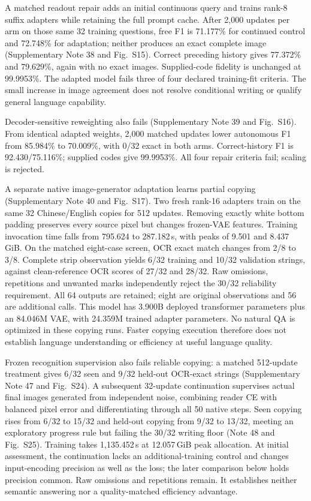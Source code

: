 \documentclass[12pt,a4paper]{article}
\begin{document}
A matched readout repair adds an initial continuous query and trains rank-8
suffix adapters while retaining the full prompt cache. After 2,000 updates
per arm on those same 32 training questions, free F1 is 71.177\% for continued
control and 72.748\% for adaptation; neither produces an exact complete image
(Supplementary Note 38 and Fig.~S15). Correct preceding history gives
77.372\% and 79.629\%, again with no exact images. Supplied-code fidelity is
unchanged at 99.9953\%. The adapted model fails three of four declared
training-fit criteria. The small increase in image agreement does not resolve
conditional writing or qualify general language capability.

Decoder-sensitive reweighting also fails (Supplementary Note 39 and
Fig.~S16). From identical adapted weights, 2,000 matched updates lower
autonomous F1 from 85.984\% to 70.009\%, with 0/32 exact in both arms.
Correct-history F1 is 92.430/75.116\%; supplied codes give 99.9953\%.
All four repair criteria fail; scaling is rejected.

A separate native image-generator adaptation learns partial copying
(Supplementary Note 40 and Fig.~S17). Two fresh rank-16 adapters train on the
same 32 Chinese/English copies for 512 updates. Removing exactly white bottom
padding preserves every source pixel but changes frozen-VAE features. Training
invocation time falls from 795.624 to 287.182\,s, with peaks of 9.501 and
8.437\,GiB. On the matched eight-case screen, OCR exact match changes from
2/8 to 3/8. Complete strip observation yields 6/32 training and 10/32 validation
strings, against clean-reference OCR scores of 27/32 and 28/32. Raw omissions,
repetitions and unwanted marks independently reject the 30/32 reliability
requirement. All 64 outputs are retained; eight are original observations and
56 are additional calls. This model has 3.900B deployed transformer parameters
plus an 84.046M VAE, with 24.359M trained adapter parameters. No natural QA is
optimized in these copying runs. Faster copying execution therefore does not
establish language understanding or efficiency at useful language quality.

Frozen recognition supervision also fails reliable copying: a matched
512-update treatment gives 6/32 seen and 9/32 held-out OCR-exact strings
(Supplementary Note 47 and Fig.~S24). A subsequent 32-update continuation
supervises actual final images generated from independent noise, combining
reader CE with balanced pixel error and differentiating through all 50
native steps\cite{draft}. Seen copying rises from 6/32 to 15/32 and held-out
copying from 9/32 to 13/32, meeting an exploratory progress rule but failing
the 30/32 writing floor (Note 48 and Fig.~S25). Training takes 1,135.452\,s
at 12.057\,GiB peak allocation. At initial assessment, the continuation lacks
an additional-training control and changes input-encoding precision as well
as the loss; the later comparison below holds precision common. Raw omissions
and repetitions remain. It establishes neither semantic answering nor a
quality-matched efficiency advantage.
\end{document}
